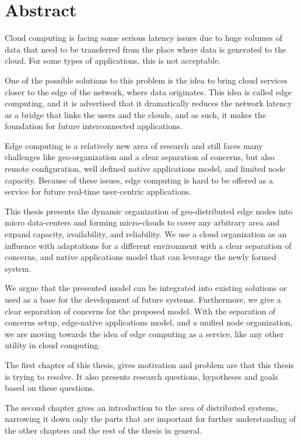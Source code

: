 \chapter*{Abstract}
Cloud computing is facing some serious latency issues due to huge volumes of data that need to be transferred from the place where data is generated to the cloud. For some types of applications, this is not acceptable. 

One of the possible solutions to this problem is the idea to bring cloud services closer to the edge of the network, where data originates. This idea is called edge computing, and it is advertised that it dramatically reduces the network latency as a bridge that links the users and the clouds, and as such, it makes the foundation for future interconnected applications.

Edge computing is a relatively new area of research
and still faces many challenges like geo-organization and a clear separation of concerns, but also remote configuration, well defined native applications model, and limited node capacity. Because of these issues, edge computing is hard to be offered as a service for future real-time user-centric applications. 

This thesis presents the dynamic organization of geo-distributed edge nodes into micro data-centers and forming micro-clouds to cover any arbitrary area and expand capacity, availability, and reliability. We use a cloud organization as an influence with adaptations for a different environment with a clear separation of concerns, and native applications model that can leverage the newly formed system.

We argue that the presented model can be integrated into existing solutions or used as a base for the development of future systems. Furthermore, we give a clear separation of concerns for the proposed model. With the separation of concerns setup, edge-native applications model, and a unified node organization, we are moving towards the idea of edge computing as a service, like any other utility in cloud computing. 

The first chapter of this thesis, gives motivation and problem are that this thesis is trying to resolve. It also presents research questions, hypotheses and goals based on these questions.

The second chapter gives an introduction to the area of distributed systems, narrowing it down only the parts that are important for further understanding of the other chapters and the rest of the thesis in general.

